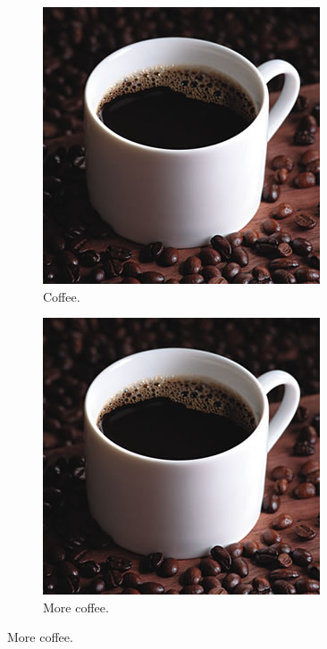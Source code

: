 \begin{figure}[ht!]
	\centering
	\caption{The same cup of coffee. Two times.}
	\begin{subfigure}[b]{0.4\linewidth}
		\includegraphics[width=\linewidth]{2-textuais/figs/coffee.jpg}
		\caption{Coffee.}
	\end{subfigure}
	\begin{subfigure}[b]{0.4\linewidth}
		\includegraphics[width=\linewidth]{2-textuais/figs/coffee.jpg}
		\caption{More coffee.}
	\end{subfigure}
	\label{fig:coffee1}
\end{figure}


